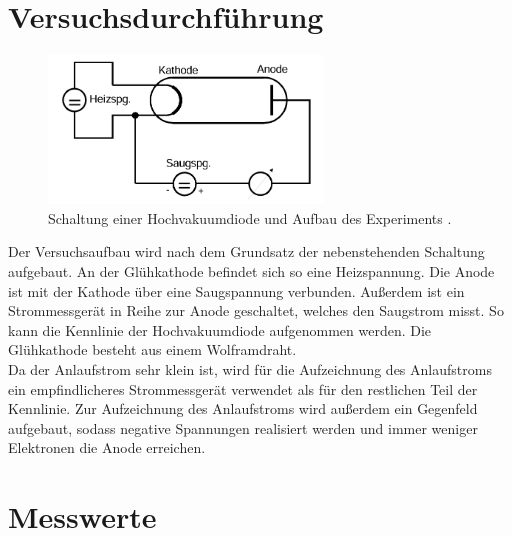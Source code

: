 %

%
\section{Versuchsdurchführung}

\begin{figure}
    \vspace{-20pt}
    \begin{center}
        \includegraphics[width=0.65\textwidth]{content/Schaltung.png}
        \caption{Schaltung einer Hochvakuumdiode und Aufbau des Experiments \cite{Versuchsanleitung_v504}.}
    \end{center}
\end{figure}

Der Versuchsaufbau wird nach dem Grundsatz der nebenstehenden Schaltung aufgebaut. An der Glühkathode 
befindet sich so eine Heizspannung. Die Anode ist mit der Kathode über eine Saugspannung verbunden. 
Außerdem ist ein Strommessgerät in Reihe zur Anode geschaltet, welches den Saugstrom misst. So kann 
die Kennlinie der Hochvakuumdiode aufgenommen werden. Die Glühkathode besteht aus einem Wolframdraht. \\
\noindent Da der Anlaufstrom sehr klein ist, wird für die Aufzeichnung des Anlaufstroms ein empfindlicheres 
Strommessgerät verwendet als für den restlichen Teil der Kennlinie.
Zur Aufzeichnung des Anlaufstroms wird außerdem ein Gegenfeld aufgebaut, sodass negative Spannungen 
realisiert werden und immer weniger Elektronen die Anode erreichen. 


\section{Messwerte}
\label{sec:Messwerte}

